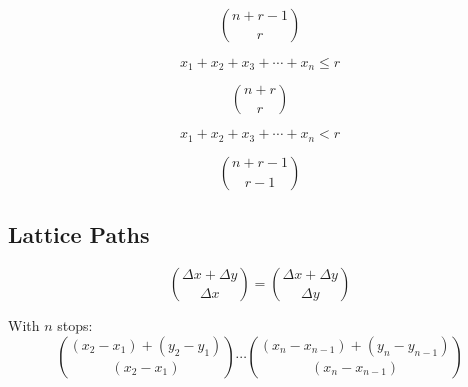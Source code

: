 \documentclass{article}
\begin{document}
    $${n + r - 1 \choose r}$$

    $$x_1 + x_2 + x_3 + \cdots + x_n \leq r$$
    
    $${n + r \choose r}$$

    $$x_1 + x_2 + x_3 + \cdots + x_n < r$$
    
    $${n + r - 1 \choose r - 1}$$

    \subsection{Lattice Paths}

    \begin{equation}
        {\Delta x + \Delta y \choose \Delta x} = {\Delta x + \Delta y \choose \Delta y}
    \end{equation}

    With $n$ stops: \begin{equation}
        {(x_2 - x_1) + (y_2 - y_1) \choose (x_2 - x_1)} \cdots {(x_n - x_{n - 1}) + (y_n - y_{n - 1}) \choose (x_n - x_{n - 1})}
    \end{equation}
\end{document}
